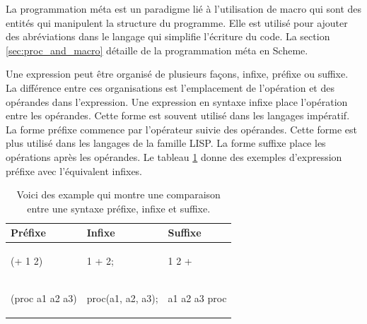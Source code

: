 La programmation méta est un paradigme lié à l'utilisation de macro qui sont
des entités qui manipulent la structure du programme. Elle est utilisé pour
ajouter des abréviations dans le langage qui simplifie l'écriture du code.  La
section \ref{sec:proc_and_macro} détaille de la programmation méta en Scheme.

Une expression peut être organisé de plusieurs façons, infixe, préfixe ou
suffixe.  La différence entre ces organisations est l'emplacement de
l'opération et des opérandes dans l'expression.  Une expression en syntaxe
infixe place l'opération entre les opérandes.  Cette forme est souvent utilisé
dans les langages impératif. La forme préfixe commence par l'opérateur suivie
des opérandes. Cette forme est plus utilisé dans les langages de la famille
LISP.  La forme suffixe place les opérations après les opérandes.  Le tableau
\ref{tab:prefix_vs_infix} donne des exemples d'expression préfixe avec
l'équivalent infixes.




\begin{table}[htbp]
\begin{center}
\begin{tabular}{|l|l|l|}
  \hline
  \textbf{Préfixe}& \textbf{Infixe}& \textbf{Suffixe}\\\hline
  \begin{mplisting}{0.1}
(+ 1 2)
\end{mplisting}&
  \begin{mplisting}{0.1}
1 + 2;
\end{mplisting}&
  \begin{mplisting}{0.1}
1 2 +
\end{mplisting}\\
\hline
  \begin{mplisting}{0.22}
(proc a1 a2 a3)
\end{mplisting}&
  \begin{mplisting}{0.22}
proc(a1, a2, a3);
\end{mplisting}&
  \begin{mplisting}{0.22}
a1 a2 a3 proc
\end{mplisting}\\
\hline
\end{tabular}
\end{center}
  \caption{Voici des example qui montre une comparaison entre une syntaxe préfixe, infixe et suffixe.}
  \label{tab:prefix_vs_infix}
\end{table}

